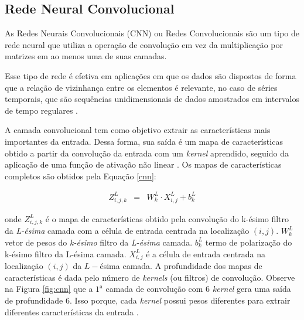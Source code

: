 \subsection{Rede Neural Convolucional}

As Redes Neurais Convolucionais (CNN) ou Redes Convolucionais são um tipo de rede neural que utiliza a operação de convolução em vez da multiplicação por matrizes em ao menos uma de suas camadas.

Esse tipo de rede é efetiva em aplicações \cite{7533055} em que os dados são dispostos de forma que a relação de vizinhança entre os elementos é relevante, no caso de séries temporais, que são sequências unidimensionais de dados amostrados em intervalos de tempo regulares \cite{silva_2021}.


A camada convolucional tem como objetivo extrair as características mais importantes da entrada. Dessa forma, sua saída é um mapa de características obtido a partir da convolução da entrada com um \textit{kernel} aprendido, seguido da aplicação de uma função de ativação não linear \cite{lucas_2019}. Os mapas de características completos são obtidos pela Equação \eqref{cnn}:

\begin{eqnarray}
	Z_{i, j, k}^L&=&W_k^L \cdot X_{i, j}^L+b_k^L\label{cnn}
\end{eqnarray}

\noindent onde
$Z_{i, j, k}^L$ é o mapa de características obtido pela convolução do k-ésimo filtro da \textit{L-ésima} camada com a célula de entrada centrada na localização $(i, j)$.
$W_k^L$ vetor de pesos do \textit{k-ésimo} filtro da \textit{L-ésima} camada.
$b_k^L$ termo de polarização do k-ésimo filtro da L-ésima camada.
$X_{i, j}^L$ é a célula de entrada centrada na localização $(i,j)$ da $L-$ésima camada.
A profundidade dos mapas de características é dada pelo número de \textit{kernels} (ou filtros) de convolução. Observe na Figura \ref{fig:cnn} que a $1^{\mathrm{a}}$
camada de convolução com 6 \textit{kernel} gera uma saída de profundidade 6. Isso porque, cada \textit{kernel} possui pesos diferentes para extrair diferentes características da entrada \cite{lucas_2019}.

